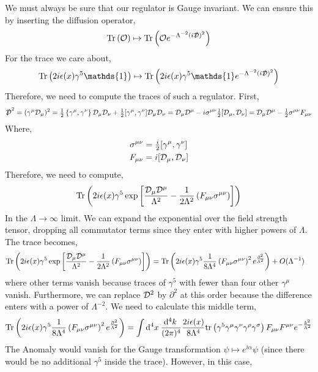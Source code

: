\documentclass[12pt]{extarticle}
\begin{document}
We must always be sure that our regulator is Gauge invariant. We can ensure this by inserting the diffusion operator,
\[ \mathrm{Tr}\left( \mathcal{O} \right) \mapsto \mathrm{Tr}\left( \mathcal{O} e^{- \Lambda^{-2} (i \slashed{\mathcal{D}})^2} \right) \]
For the trace we care about,
\[ \Tr{2 i \epsilon(x) \gamma^5 \mathds{1}} \mapsto \Tr{2 i \epsilon(x) \gamma^5 \mathds{1} e^{- \Lambda^{-2} (i \slashed{\covD})^2}} \]
Therefore, we need to compute the traces of such a regulator. First,
\[ \slashed{\mathcal{D}}^2 = (\gamma^\mu \mathcal{D}_\mu)^2 = \tfrac{1}{2} \left\{ \gamma^\mu, \gamma^\nu \right\} \mathcal{D}_\mu \mathcal{D}_\nu + \tfrac{1}{2} [\gamma^\mu, \gamma^\nu] \mathcal{D}_\mu \mathcal{D}_\nu = \mathcal{D}_\mu \mathcal{D}^\mu - i \sigma^{\mu \nu} \tfrac{1}{2} [\mathcal{D}_\mu, \mathcal{D}_\nu] = \mathcal{D}_\mu \mathcal{D}^\mu - \tfrac{1}{2} \sigma^{\mu \nu} F_{\mu \nu} \]
Where,
\begin{align*}
\sigma^{\mu \nu} & = \tfrac{i}{2} [\gamma^\mu, \gamma^\nu]
\\
F_{\mu \nu} & = i [\mathcal{D}_\mu, \mathcal{D}_\nu]
\end{align*}
Therefore, we need to compute,
\[ \mathrm{Tr}\left( 2 i \epsilon(x) \gamma^5 \exp{\left[ \frac{\mathcal{D}_\mu \mathcal{D}^\mu}{\Lambda^2} - \frac{1}{2 \Lambda^2} \left( F_{\mu \nu} \sigma^{\mu \nu} \right) \right] } \right) \]
In the $\Lambda \to \infty$ limit. We can expand the exponential over the field strength tensor, dropping all commutator terms since they enter with higher powers of $\Lambda$. The trace becomes,
\begin{align*}
\mathrm{Tr}\left( 2 i \epsilon(x) \gamma^5 \exp{\left[ \frac{\mathcal{D}_\mu \mathcal{D}^\mu}{\Lambda^2} - \frac{1}{2 \Lambda^2} \left( F_{\mu \nu} \sigma^{\mu \nu} \right) \right] } \right) & = \mathrm{Tr}\left( 2 i \epsilon(x) \gamma^5 \frac{1}{8 \Lambda^4} \left( F_{\mu \nu} \sigma^{\mu \nu} \right)^2 e^{\frac{\partial^2}{\Lambda^2}} \right) + O(\Lambda^{-1})
\end{align*}
where other terms vanish because traces of $\gamma^5$ with fewer than four other $\gamma^\mu$ vanish. Furthermore, we can replace $\mathcal{D}^2$ by $\partial^2$ at this order because the difference enters with a power of $\Lambda^{-2}$. We need to calculate this middle term,
\begin{align*}
\mathrm{Tr}\left( 2 i \epsilon(x) \gamma^5 \frac{1}{8 \Lambda^4} \left( F_{\mu \nu} \sigma^{\mu \nu} \right)^2 e^{\frac{\partial^2}{\Lambda^2}} \right) = \int \mathrm{d}^{4} x \: \frac{\mathrm{d}^{4} k \:}{(2\pi)^4} \frac{2 i \epsilon(x)}{8 \Lambda^4} \mathrm{tr} \left( \gamma^5 \gamma^\mu \gamma^\nu \gamma^\rho \gamma^\sigma \right) F_{\mu \nu} F^{\mu \nu} e^{- \frac{k^2}{\Lambda^2}} 
\end{align*}
The Anomaly would vanish  for the Gauge transformation $\psi \mapsto e^{i \alpha} \psi$ (since there would be no additional $\gamma^5$ inside the trace). However, in this case,
\end{document}
